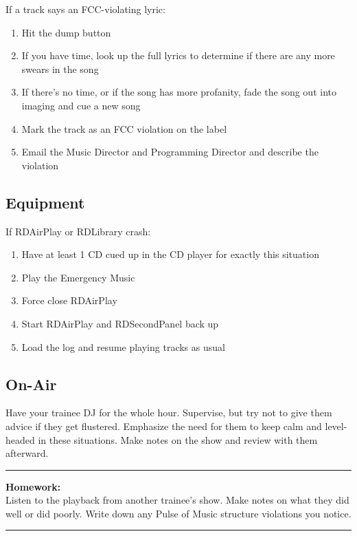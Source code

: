 \documentclass[]{witrman}
\newcommand{\makehomework}[1]{%
    \begin{samepage}
        \vspace{2pt}
        \rule{\textwidth}{1pt}
        \textbf{Homework:}\\
        #1\\
        \rule[3pt]{\textwidth}{1pt}
    \end{samepage}
}
\begin{document}
If a track says an FCC-violating lyric:
\vspace{-\topsep}
\begin{enumerate}
    \item Hit the dump button
    \item If you have time, look up the full lyrics to determine if there are
        any more swears in the song
    \item If there's no time, or if the song has more profanity, fade the song
        out into imaging and cue a new song
    \item Mark the track as an FCC violation on the label
    \item Email the Music Director and Programming Director and describe the
        violation
\end{enumerate}

\subsection{Equipment}

If RDAirPlay or RDLibrary crash:
\vspace{-\topsep}
\begin{enumerate}
    \item Have at least 1 CD cued up in the CD player for exactly this situation
    \item Play the Emergency Music
    \item Force close RDAirPlay
    \item Start RDAirPlay and RDSecondPanel back up
    \item Load the log and resume playing tracks as usual
\end{enumerate}

\subsection{On-Air}

Have your trainee DJ for the whole hour.  Supervise, but try not to give them
advice if they get flustered.  Emphasize the need for them to keep calm and
level-headed in these situations.  Make notes on the show and review with them
afterward.

\makehomework{Listen to the playback from another trainee's show.  Make notes on
what they did well or did poorly.  Write down any Pulse of Music structure
violations you notice.}
\end{document}
